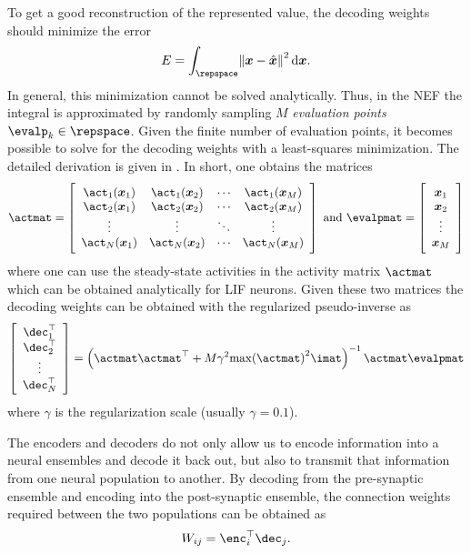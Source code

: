 To get a good reconstruction of the represented value, the decoding weights should minimize the error
\begin{equation}
    E = \int_{\repspace} \norm{\vc x - \hat{\vc x}}^2 \dif \vc x \text{.}
\end{equation}
In general, this minimization cannot be solved analytically.
Thus, in the NEF the integral is approximated by randomly sampling $M$ \emph{evaluation points} $\evalp_k \in \repspace$.
Given the finite number of evaluation points, it becomes possible to solve for the decoding weights with a least-squares minimization.
The detailed derivation is given in \textcite[Ch.~2]{eliasmith2003}.
In short, one obtains the matrices
\begin{equation}
    \actmat = \sbr{\begin{array}{cccc}
            \act_1(\vc x_1) & \act_1(\vc x_2) & \cdots & \act_1(\vc x_M) \\
            \act_2(\vc x_1) & \act_2(\vc x_2) & \cdots & \act_2(\vc x_M) \\
            \vdots & \vdots & \ddots & \vdots \\
            \act_N(\vc x_1) & \act_N(\vc x_2) & \cdots & \act_N(\vc x_M) \\
    \end{array}}
    \ \text{and}\ 
    \evalpmat = \sbr{\begin{array}{c}
            \vc x_1 \\ \vc x_2 \\ \vdots \\ \vc x_M
    \end{array}}
\end{equation}
where one can use the steady-state activities in the activity matrix $\actmat$ which can be obtained analytically for LIF neurons.
Given these two matrices the decoding weights can be obtained with the regularized pseudo-inverse as
\begin{equation}
    \sbr{\begin{array}{c}
            \dec_1\Tr \\ \dec_2\Tr \\ \vdots \\ \dec_N\Tr
        \end{array}} = \del{\actmat \actmat\Tr + M \gamma^2 {\max(\actmat)}^2 \imat}^{-1} \actmat \evalpmat
\end{equation}
where $\gamma$ is the regularization scale (usually $\gamma = 0.1$).

The encoders and decoders do not only allow us to encode information into a neural ensembles and decode it back out, but also to transmit that information from one neural population to another.
By decoding from the pre-synaptic ensemble and encoding into the post-synaptic ensemble, the connection weights required between the two populations can be obtained as
\begin{equation}
    W_{ij} = \enc_i\Tr \dec_j \text{.}
\end{equation}


